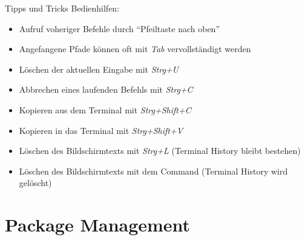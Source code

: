 \documentclass{setbeamer}
\begin{document}
\begin{frame}{Tipps und Tricks}
    Bedienhilfen:
    \begin{itemize}
        \item Aufruf voheriger Befehle durch ``Pfeiltaste nach oben''
        \item Angefangene Pfade können oft mit \emph{Tab} vervollständigt werden
        \item Löschen der aktuellen Eingabe mit \emph{Strg+U}
        \item Abbrechen eines laufenden Befehls mit \emph{Strg+C}
        \item Kopieren aus dem Terminal mit \emph{Strg+Shift+C}
        \item Kopieren in das Terminal mit \emph{Strg+Shift+V}
        \item Löschen des Bildschirmtexts mit \emph{Strg+L} (Terminal History bleibt bestehen)
        \item Löschen des Bildschirmtexts mit dem Command  (Terminal History wird gelöscht)
    \end{itemize}
\end{frame}


\section{Package Management}
\end{document}
